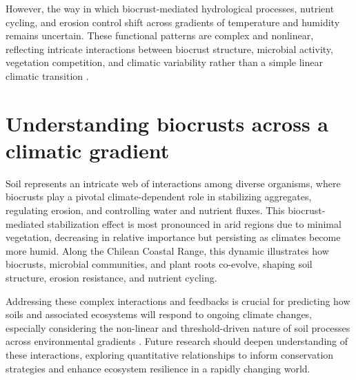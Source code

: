 However, the way in which biocrust-mediated hydrological processes, nutrient cycling, and erosion control shift across gradients of temperature and humidity remains uncertain. These functional patterns are complex and nonlinear, reflecting intricate interactions between biocrust structure, microbial activity, vegetation competition, and climatic variability rather than a simple linear climatic transition \citep{Bernhard2018,RiverasMuñoz2025}.

\section{Understanding biocrusts across a climatic gradient}
\label{sec:BiocrustClimate}

Soil represents an intricate web of interactions among diverse organisms, where biocrusts play a pivotal climate-dependent role in stabilizing aggregates, regulating erosion, and controlling water and nutrient fluxes. This biocrust-mediated stabilization effect is most pronounced in arid regions due to minimal vegetation, decreasing in relative importance but persisting as climates become more humid. Along the Chilean Coastal Range, this dynamic illustrates how biocrusts, microbial communities, and plant roots co-evolve, shaping soil structure, erosion resistance, and nutrient cycling.

Addressing these complex interactions and feedbacks is crucial for predicting how soils and associated ecosystems will respond to ongoing climate changes, especially considering the non-linear and threshold-driven nature of soil processes across environmental gradients \cite{Bernhard2018,Wang2014}. Future research should deepen understanding of these interactions, exploring quantitative relationships to inform conservation strategies and enhance ecosystem resilience in a rapidly changing world.

